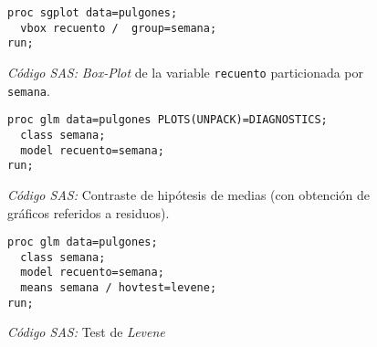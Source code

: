 \documentclass[11pt]{article}
\begin{document}
    \begin{figure}[!h]
      \centering
      \begin{verbatim}
proc sgplot data=pulgones;
  vbox recuento /  group=semana;
run;
      \end{verbatim}
      \caption{\emph{Código SAS:} \emph{Box-Plot} de la variable \texttt{recuento} particionada por \texttt{semana}.}
      \label{code:sas_4}
    \end{figure}

    \begin{figure}[!h]
      \centering
      \begin{verbatim}
proc glm data=pulgones PLOTS(UNPACK)=DIAGNOSTICS;
  class semana;
  model recuento=semana;
run;
      \end{verbatim}
      \caption{\emph{Código SAS:} Contraste de hipótesis de medias (con obtención de gráficos referidos a residuos).}
      \label{code:sas_5}
    \end{figure}

    \begin{figure}[!h]
      \centering
      \begin{verbatim}
proc glm data=pulgones;
  class semana;
  model recuento=semana;
  means semana / hovtest=levene;
run;
      \end{verbatim}
      \caption{\emph{Código SAS:} Test de \emph{Levene}}
      \label{code:sas_6}
    \end{figure}


    \nocite{rano2017}

    
    
\end{document}
